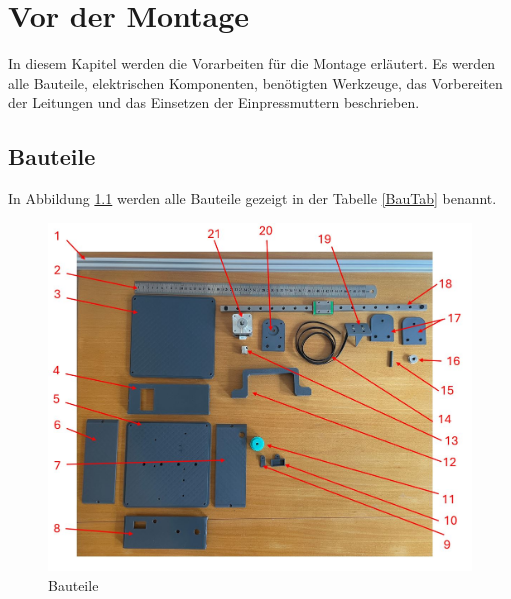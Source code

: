 %
%
\chapter{Vor der Montage}
In diesem Kapitel werden die Vorarbeiten für die Montage erläutert. Es werden alle Bauteile, elektrischen Komponenten, benötigten Werkzeuge, das Vorbereiten der Leitungen und das Einsetzen der Einpressmuttern beschrieben.

\section{Bauteile}
In Abbildung \ref{Bauteile} werden alle Bauteile gezeigt in der Tabelle \ref{BauTab} benannt.

\begin{figure}[H]
	\begin{center}
		\includegraphics[width=\textwidth]{Images/BauTeile.jpg}
		\caption{Bauteile} \label{Bauteile}
	\end{center}
\end{figure}

